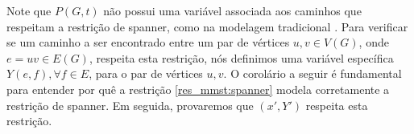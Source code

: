 \documentclass[11pt,reqno]{amsart}
\newtheorem{proposicao}{Proposição}
\begin{document}




Note que $P(G,t)$ não possui uma variável associada aos 
caminhos que respeitam a restrição de spanner, como na modelagem tradicional 
\cite{SigurdZ2004,DinitzK2011}. 
Para verificar se um caminho 
a ser encontrado entre um par de vértices $u,v \in V(G)$, onde $e=uv \in E(G)$, 
respeita esta restrição,  %
nós definimos uma variável específica $Y(e,f), \forall f \in E$, para o par 
de vértices $u,v$. 
O corolário a seguir é fundamental para entender por quê a restrição 
\ref{res_mmst:spanner} modela corretamente a restrição de spanner. Em seguida, 
provaremos que $(x',Y')$ %
respeita esta restrição.
\end{document}
